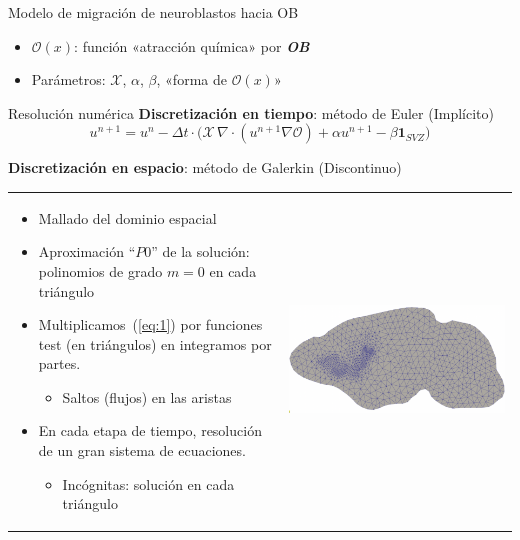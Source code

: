 \documentclass[
  unknownkeysallowed %
]{beamer}
\begin{document}
\begin{frame}{Modelo de migración de neuroblastos hacia OB}
\begin{overprint}
  \end{overprint}
  \bigskip
  \begin{itemize}\itemsep0.2em
  \item<2-> $\mathcal{O}(x)$: función «atracción química» por {\color{OBcolor}\textbf{\textit{OB}}}
  \item<3-> Parámetros: $ \mathcal{X}$, $\alpha$, $\beta$, «forma de $\mathcal{O}(x)$»
  \end{itemize}
\end{frame}

\begin{frame}{Resolución numérica}
    \textbf{Discretización en \alert{tiempo}}: método de Euler (Implícito)
    \begin{equation}
    u^{n+1} = u^n - \Delta t \cdot \big( \mathcal{X}\,\nabla\cdot(u^{n+1} \nabla\mathcal{O})
    + \alpha u^{n+1} -\beta \mathbf{1}_{SVZ} \big)
    \label{eq:1}
  \end{equation}

  \textbf{Discretización en \alert{espacio}}: método de Galerkin (Discontinuo)
  \par\medskip
    \begin{tabular*}{\linewidth}{ll}
      \begin{minipage}{0.66\linewidth}
        \small
        \begin{itemize}
        \item Mallado del dominio espacial
        \item Aproximación ``$P0$'' de la solución: polinomios de grado $m=0$ en cada triángulo
        \item Multiplicamos~(\ref{eq:1}) por funciones test (en triángulos) en integramos por partes.
          \begin{itemize}
          \item Saltos (flujos) en las aristas
        \end{itemize}
      \item En cada etapa de tiempo, resolución de un gran sistema de ecuaciones.
        \begin{itemize}
        \item Incógnitas: solución en cada triángulo
      \end{itemize}
        \end{itemize}
      \end{minipage}
      &
        \includegraphics[width=0.31\linewidth]{img/brain_mesh}
    \end{tabular*}
\end{frame}
\end{document}
